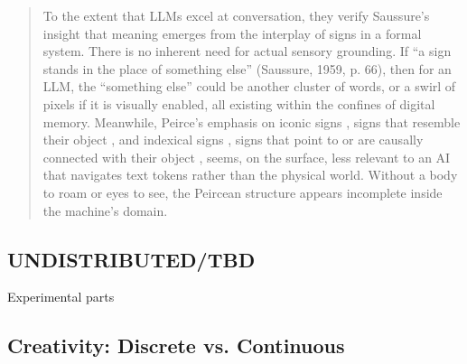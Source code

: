 \begin{quote}
	To the extent that LLMs excel at conversation, they verify Saussure’s insight that meaning emerges from the interplay of signs in a formal system. There is no inherent need for actual sensory grounding. If “a sign stands in the place of something else” (Saussure, 1959, p. 66), then for an LLM, the “something else” could be another cluster of words, or a swirl of pixels if it is visually enabled, all existing within the confines of digital memory. Meanwhile, Peirce’s emphasis on iconic signs , signs that resemble their object , and indexical signs , signs that point to or are causally connected with their object , seems, on the surface, less relevant to an AI that navigates text tokens rather than the physical world. Without a body to roam or eyes to see, the Peircean structure appears incomplete inside the machine’s domain.
	\parencite{filimowicz2025}
\end{quote}


\subsection{UNDISTRIBUTED/TBD}

\begin{orangebox}
	Experimental parts
\end{orangebox}


\subsection{Creativity: Discrete vs. Continuous}


